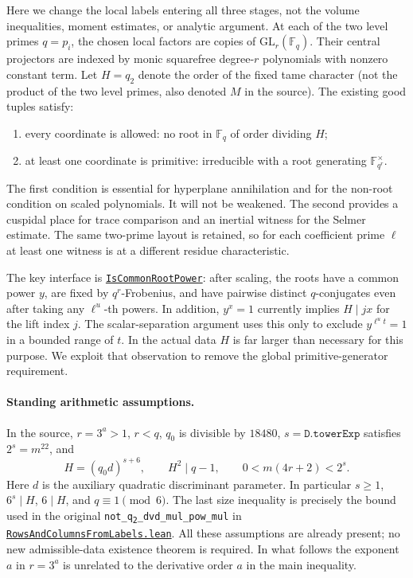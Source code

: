 \documentclass[11pt]{article}
\theoremstyle{definition}\newtheorem{definition}[theorem]{Definition}
\newcommand{\F}{\mathbb F}\newcommand{\ord}{\operatorname{ord}}\newcommand{\Nrm}{\operatorname{N}}\newcommand{\vpp}{v_p}
\newcommand{\src}[2]{\href{https://github.com/VladimirReshetnikov/ProveIt/blob/ee10f937fedac0955d28b7b860f4c44fab508204/Analysis/GeneralizedRiemannHypothesis/Lean/grh/src/#1}{\texttt{#2}}}
\begin{document}
Here we change the local labels entering all three stages, not the volume inequalities, moment estimates, or analytic argument. At each of the two level primes $q=p_i$, the chosen local factors are copies of $\mathrm{GL}_r(\F_q)$. Their central projectors are indexed by monic squarefree degree-$r$ polynomials with nonzero constant term. Let $H=q_2$ denote the order of the fixed tame character (not the product of the two level primes, also denoted $M$ in the source). The existing good tuples satisfy:
\begin{enumerate}
\item every coordinate is allowed: no root in $\F_q$ of order dividing $H$;
\item at least one coordinate is primitive: irreducible with a root generating $\F_{q^r}^{\times}$.
\end{enumerate}
The first condition is essential for hyperplane annihilation and for the non-root condition on scaled polynomials. It will not be weakened. The second provides a cuspidal place for trace comparison and an inertial witness for the Selmer estimate. The same two-prime layout is retained, so for each coefficient prime $\ell$ at least one witness is at a different residue characteristic.

The key interface is \src{New/Congruences/GaloisRepresentations/RowsAndColumnsFromLabels.lean\#L326}{IsCommonRootPower}: after scaling, the roots have a common power $y$, are fixed by $q^r$-Frobenius, and have pairwise distinct $q$-conjugates even after taking any $\ell^u$-th powers. In addition, $y^x=1$ currently implies $H\mid jx$ for the lift index $j$. The scalar-separation argument uses this only to exclude $y^{\ell^u t}=1$ in a bounded range of $t$. In the actual data $H$ is far larger than necessary for this purpose. We exploit that observation to remove the global primitive-generator requirement.

\paragraph{Standing arithmetic assumptions.}
In the source, $r=3^a>1$, $r<q$, $q_0$ is divisible by $18480$, $s=\texttt{D.towerExp}$ satisfies $2^s=m^{22}$, and
\[
 H=(q_0d)^{s+6},\qquad H^2\mid q-1,\qquad
 0<m(4r+2)<2^s.
\]
Here $d$ is the auxiliary quadratic discriminant parameter. In particular $s\ge1$, $6^s\mid H$, $6\mid H$, and $q\equiv1\pmod6$. The last size inequality is precisely the bound used in the original \texttt{not\_q\textsubscript{2}\_dvd\_mul\_pow\_mul} in \src{New/Congruences/GaloisRepresentations/RowsAndColumnsFromLabels.lean\#L112}{RowsAndColumnsFromLabels.lean}. All these assumptions are already present; no new admissible-data existence theorem is required. In what follows the exponent $a$ in $r=3^a$ is unrelated to the derivative order $a$ in the main inequality.
\end{document}
